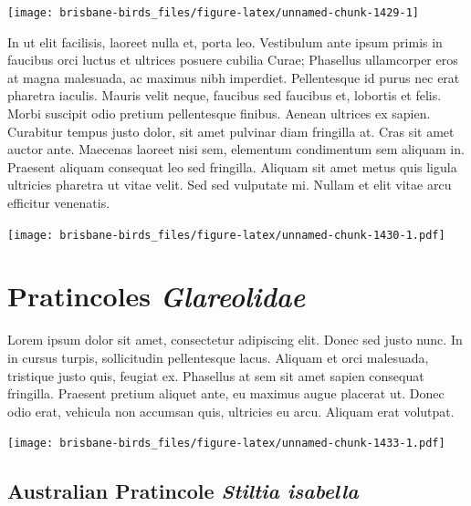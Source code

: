 \documentclass[]{book}
\let\origfigure\figure
\let\endorigfigure\endfigure
\renewenvironment{figure}[1][2] {
  \expandafter\origfigure\expandafter[H]
} {
  \endorigfigure
}
\begin{document}
\begin{figure}
\texttt{[image: brisbane-birds\_files/figure-latex/unnamed-chunk-1429-1]} \caption{insert figure caption}\label{fig:unnamed-chunk-1429}
\end{figure}

In ut elit facilisis, laoreet nulla et, porta leo. Vestibulum ante ipsum
primis in faucibus orci luctus et ultrices posuere cubilia Curae;
Phasellus ullamcorper eros at magna malesuada, ac maximus nibh
imperdiet. Pellentesque id purus nec erat pharetra iaculis. Mauris velit
neque, faucibus sed faucibus et, lobortis et felis. Morbi suscipit odio
pretium pellentesque finibus. Aenean ultrices ex sapien. Curabitur
tempus justo dolor, sit amet pulvinar diam fringilla at. Cras sit amet
auctor ante. Maecenas laoreet nisi sem, elementum condimentum sem
aliquam in. Praesent aliquam consequat leo sed fringilla. Aliquam sit
amet metus quis ligula ultricies pharetra ut vitae velit. Sed sed
vulputate mi. Nullam et elit vitae arcu efficitur venenatis.

\begin{figure}
\centering
\texttt{[image: brisbane-birds\_files/figure-latex/unnamed-chunk-1430-1.pdf]}
\caption{\label{fig:unnamed-chunk-1430}insert figure caption}
\end{figure}

\chapter{\texorpdfstring{Pratincoles
\emph{Glareolidae}}{Pratincoles Glareolidae}}\label{pratincoles-glareolidae}

Lorem ipsum dolor sit amet, consectetur adipiscing elit. Donec sed justo
nunc. In in cursus turpis, sollicitudin pellentesque lacus. Aliquam et
orci malesuada, tristique justo quis, feugiat ex. Phasellus at sem sit
amet sapien consequat fringilla. Praesent pretium aliquet ante, eu
maximus augue placerat ut. Donec odio erat, vehicula non accumsan quis,
ultricies eu arcu. Aliquam erat volutpat.

\texttt{[image: brisbane-birds\_files/figure-latex/unnamed-chunk-1433-1.pdf]}

\section{\texorpdfstring{Australian Pratincole \emph{Stiltia
isabella}}{Australian Pratincole Stiltia isabella}}\label{australian-pratincole-stiltia-isabella}
\end{document}
